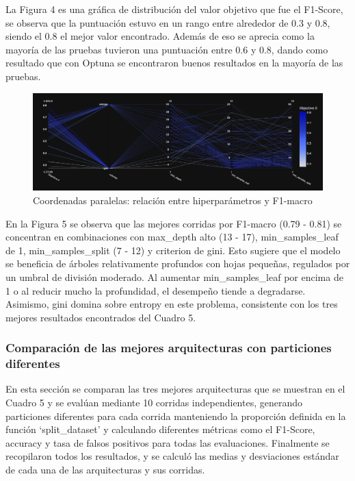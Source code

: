 \documentclass[12pt,a4paper]{article}
\begin{document}
La Figura 4 es una gráfica de distribución del valor objetivo que fue el F1-Score, se observa que
la puntuación estuvo en un rango entre alrededor de 0.3 y 0.8, siendo el 0.8 el mejor valor encontrado.
Además de eso se aprecia como la mayoría de las pruebas tuvieron una puntuación entre 0.6 y 0.8,
dando como resultado que con Optuna se encontraron buenos resultados en la mayoría de las pruebas.

\begin{figure}[H]
  \centering
  \includegraphics[width=1\textwidth]{../img/ParallelDecisionTree.png}
  \caption{Coordenadas paralelas: relación entre hiperparámetros y F1-macro}\label{fig:parallel-decision-tree}
\end{figure}

En la Figura 5 se observa que las mejores corridas por F1-macro (0.79 - 0.81)
se concentran en combinaciones con max_depth alto (13 - 17), min_samples_leaf de 1, min_samples_split (7 - 12)
y criterion de gini. Esto sugiere que el modelo se beneficia de árboles relativamente profundos con hojas pequeñas,
regulados por un umbral de división moderado. Al aumentar min_samples_leaf por encima de 1 o al reducir mucho la profundidad,
el desempeño tiende a degradarse. Asimismo, gini domina sobre entropy en este problema,
consistente con los tres mejores resultados encontrados del Cuadro 5.

\subsubsection{Comparación de las mejores arquitecturas con particiones diferentes}

En esta sección se comparan las tres mejores arquitecturas que se muestran en el Cuadro 5 y se evalúan
mediante 10 corridas independientes, generando particiones diferentes para cada corrida manteniendo la
proporción definida en la función `split_dataset' y calculando diferentes métricas
como el F1-Score, accuracy y tasa de falsos positivos para todas las evaluaciones.
Finalmente se recopilaron todos los resultados, y se calculó las medias
y desviaciones estándar de cada una de las arquitecturas y sus corridas.
\end{document}
